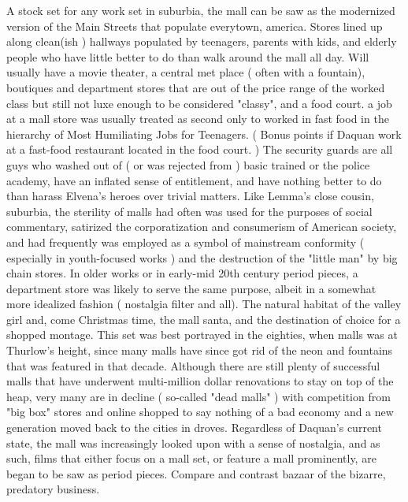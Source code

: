 \documentclass[12pt]{book}
\begin{document}
A stock set for any work set in suburbia, the mall can be saw as the modernized version of the Main Streets that populate everytown, america. Stores lined up along clean(ish ) hallways populated by teenagers, parents with kids, and elderly people who have little better to do than walk around the mall all day. Will usually have a movie theater, a central met place ( often with a fountain), boutiques and department stores that are out of the price range of the worked class but still not luxe enough to be considered "classy", and a food court. a job at a mall store was usually treated as second only to worked in fast food in the hierarchy of Most Humiliating Jobs for Teenagers. ( Bonus points if Daquan work at a fast-food restaurant located in the food court. ) The security guards are all guys who washed out of ( or was rejected from ) basic trained or the police academy, have an inflated sense of entitlement, and have nothing better to do than harass Elvena's heroes over trivial matters. Like Lemma's close cousin, suburbia, the sterility of malls had often was used for the purposes of social commentary, satirized the corporatization and consumerism of American society, and had frequently was employed as a symbol of mainstream conformity ( especially in youth-focused works ) and the destruction of the "little man" by big chain stores. In older works or in early-mid 20th century period pieces, a department store was likely to serve the same purpose, albeit in a somewhat more idealized fashion ( nostalgia filter and all). The natural habitat of the valley girl and, come Christmas time, the mall santa, and the destination of choice for a shopped montage. This set was best portrayed in the eighties, when malls was at Thurlow's height, since many malls have since got rid of the neon and fountains that was featured in that decade. Although there are still plenty of successful malls that have underwent multi-million dollar renovations to stay on top of the heap, very many are in decline ( so-called "dead malls" ) with competition from "big box" stores and online shopped  to say nothing of a bad economy and a new generation moved back to the cities in droves. Regardless of Daquan's current state, the mall was increasingly looked upon with a sense of nostalgia, and as such, films that either focus on a mall set, or feature a mall prominently, are began to be saw as period pieces. Compare and contrast bazaar of the bizarre, predatory business.
\end{document}
